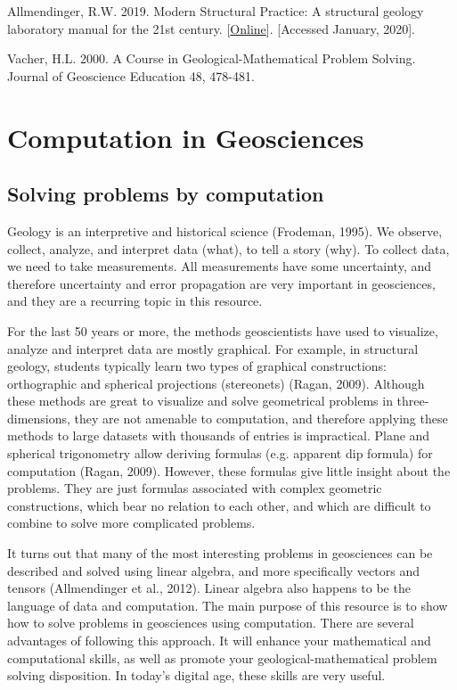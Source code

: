 \documentclass[a4paper , 12pt]{book}
\begin{document}
Allmendinger, R.W. 2019. Modern Structural Practice: A structural geology laboratory manual for the 21st century. [\href{http://www.geo.cornell.edu/geology/faculty/RWA/structure-lab-manual}{Online}]. [Accessed January, 2020].

Vacher, H.L. 2000. A Course in Geological-Mathematical Problem Solving. Journal of Geoscience Education 48, 478-481.

\tableofcontents

\chapter{Computation in Geosciences}

\section{Solving problems by computation}

Geology is an interpretive and historical science (Frodeman, 1995). We observe, collect, analyze, and interpret data (what), to tell a story (why). To collect data, we need to take measurements. All measurements have some uncertainty, and therefore uncertainty and error propagation are very important in geosciences, and they are a recurring topic in this resource.

For the last 50 years or more, the methods geoscientists have used to visualize, analyze and interpret data are mostly graphical. For example, in structural geology, students typically learn two types of graphical constructions: orthographic and  spherical projections (stereonets) (Ragan, 2009). Although these methods are great to visualize and solve geometrical problems in three-dimensions, they are not amenable to computation, and therefore applying these methods to large datasets with thousands of entries is impractical. Plane and spherical trigonometry allow deriving formulas (e.g. apparent dip formula) for computation (Ragan, 2009). However, these formulas give little insight about the problems. They are just formulas associated with complex geometric constructions, which bear no relation to each other, and which are difficult to combine to solve more complicated problems.

It turns out that many of the most interesting problems in geosciences can be described and solved using linear algebra, and more specifically vectors and tensors (Allmendinger et al., 2012). Linear algebra also happens to be the language of data and computation. The main purpose of this resource is to show how to solve problems in geosciences using computation. There are several advantages of following this approach. It will enhance your mathematical and computational skills, as well as promote your geological-mathematical problem solving disposition. In today’s digital age, these skills are very useful.
\end{document}
